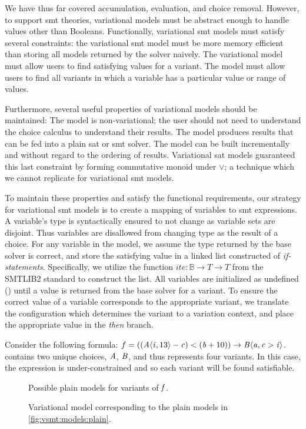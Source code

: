 \label{section:vsmt:models}
We have thus far covered accumulation, evaluation, and choice removal. However,
to support \ac{smt} theories, variational models must be abstract enough to
handle values other than Booleans. Functionally, variational \ac{smt} models
must satisfy several constraints: the variational \ac{smt} model must be more
memory efficient than storing all models returned by the solver naively. The
variational model must allow users to find satisfying values for a variant. The
model must allow users to find all variants in which a variable has a particular
value or range of values.

Furthermore, several useful properties of variational models should be
maintained: The model is non-variational; the user should not need to understand
the choice calculus to understand their results. The model produces results that
can be fed into a plain \ac{sat} or \ac{smt} solver. The model can be built
incrementally and without regard to the ordering of results. Variational
\ac{sat} models guaranteed this last constraint by forming commutative monoid
under $\vee$; a technique which we cannot replicate for variational \ac{smt}
models.

To maintain these properties and satisfy the functional requirements, our
strategy for variational \ac{smt} models is to create a mapping of variables to
\ac{smt} expressions. A variable's type is syntactically ensured to not change
as variable sets are disjoint. Thus variables are disallowed from changing type
as the result of a choice. For any variable in the model, we assume the type
returned by the base solver is correct, and store the satisfying value in a
linked list constructed of \emph{if-statements}. Specifically, we utilize the
function $ite : \mathbb{B} \rightarrow T \rightarrow T$ from the SMTLIB2
standard to construct the list. All variables are initialized as undefined
(\undefined) until a value is returned from the base solver for a variant. To
ensure the correct value of a variable corresponds to the appropriate variant,
we translate the configuration which determines the variant to a variation
context, and place the appropriate value in the \emph{then} branch.

Consider the following \evpl{} formula: $f = ((\chc[A]{\iV{}, 13} - \cV{}) <
(\bV + 10)) \rightarrow \chc[B]{\aV{}, \cV{} > \iV{}}$. \fV{} contains two
unique choices, $\mathit{A}$, $\mathit{B}$, and thus represents four variants. In this
case, the expression is under-constrained and so each variant will be found
satisfiable.
%
\begin{figure}[h]
  \centering
  
  \caption{Possible plain models for variants of $\mathit{f}$.}%
  \label{fig:vsmt:models:plain}
\end{figure}
\begin{figure}[h]
  \centering
  
  \caption{Variational model corresponding to the plain models in
    \autoref{fig:vsmt:models:plain}.}%
  \label{fig:vsmt:models:var}
\end{figure}

